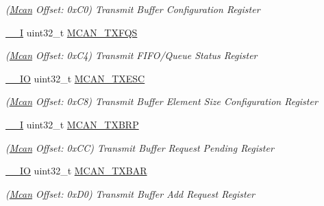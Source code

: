 \begin{DoxyCompactItemize}
\begin{DoxyCompactList}\small\item\em (\mbox{\hyperlink{structMcan}{Mcan}} Offset\+: 0x\+C0) Transmit Buffer Configuration Register \end{DoxyCompactList}\item 
\mbox{\label{structMcan_a2c2f5a1a4e80c7b6d9cba7b45e9657c7}} 
\mbox{\hyperlink{core__cm7_8h_af63697ed9952cc71e1225efe205f6cd3}{\+\_\+\+\_\+I}} uint32\+\_\+t \mbox{\hyperlink{structMcan_a2c2f5a1a4e80c7b6d9cba7b45e9657c7}{M\+C\+A\+N\+\_\+\+T\+X\+F\+QS}}
\begin{DoxyCompactList}\small\item\em (\mbox{\hyperlink{structMcan}{Mcan}} Offset\+: 0x\+C4) Transmit F\+I\+F\+O/\+Queue Status Register \end{DoxyCompactList}\item 
\mbox{\label{structMcan_ab531e5793d5c4f7083f41c8e786d0393}} 
\mbox{\hyperlink{core__cm7_8h_aec43007d9998a0a0e01faede4133d6be}{\+\_\+\+\_\+\+IO}} uint32\+\_\+t \mbox{\hyperlink{structMcan_ab531e5793d5c4f7083f41c8e786d0393}{M\+C\+A\+N\+\_\+\+T\+X\+E\+SC}}
\begin{DoxyCompactList}\small\item\em (\mbox{\hyperlink{structMcan}{Mcan}} Offset\+: 0x\+C8) Transmit Buffer Element Size Configuration Register \end{DoxyCompactList}\item 
\mbox{\label{structMcan_a0d9bcf293a38d02f600568d01e0beeb3}} 
\mbox{\hyperlink{core__cm7_8h_af63697ed9952cc71e1225efe205f6cd3}{\+\_\+\+\_\+I}} uint32\+\_\+t \mbox{\hyperlink{structMcan_a0d9bcf293a38d02f600568d01e0beeb3}{M\+C\+A\+N\+\_\+\+T\+X\+B\+RP}}
\begin{DoxyCompactList}\small\item\em (\mbox{\hyperlink{structMcan}{Mcan}} Offset\+: 0x\+CC) Transmit Buffer Request Pending Register \end{DoxyCompactList}\item 
\mbox{\label{structMcan_abba0ea320d9236de309d29cad47b8cc6}} 
\mbox{\hyperlink{core__cm7_8h_aec43007d9998a0a0e01faede4133d6be}{\+\_\+\+\_\+\+IO}} uint32\+\_\+t \mbox{\hyperlink{structMcan_abba0ea320d9236de309d29cad47b8cc6}{M\+C\+A\+N\+\_\+\+T\+X\+B\+AR}}
\begin{DoxyCompactList}\small\item\em (\mbox{\hyperlink{structMcan}{Mcan}} Offset\+: 0x\+D0) Transmit Buffer Add Request Register \end{DoxyCompactList}\item 

\end{DoxyCompactItemize}
